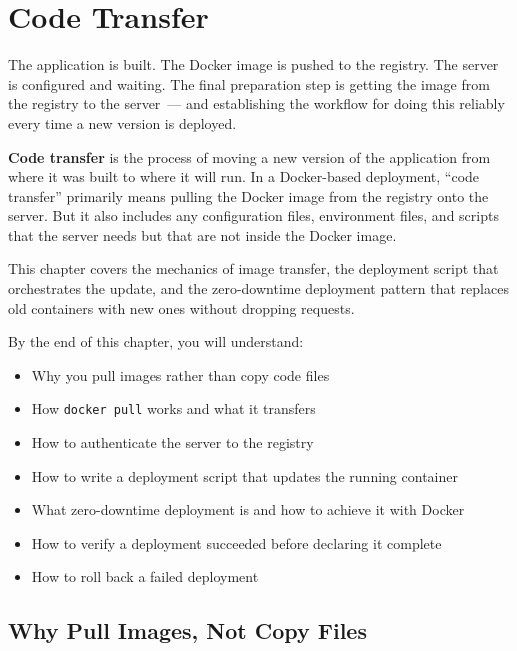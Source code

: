 \setcounter{chapter}{22}
\chapter{Code Transfer}\label{ch:23-code-transfer}

\chapterrule

The application is built. The Docker image is pushed to the registry. The server is configured and waiting. The final preparation step is getting the image from the registry to the server~--- and establishing the workflow for doing this reliably every time a new version is deployed.

\textbf{Code transfer} is the process of moving a new version of the application from where it was built to where it will run. In a Docker-based deployment, ``code transfer'' primarily means pulling the Docker image from the registry onto the server. But it also includes any configuration files, environment files, and scripts that the server needs but that are not inside the Docker image.

This chapter covers the mechanics of image transfer, the deployment script that orchestrates the update, and the zero-downtime deployment pattern that replaces old containers with new ones without dropping requests.

\begin{objectives}

By the end of this chapter, you will understand:

\begin{itemize}
\tightlist
\item
  Why you pull images rather than copy code files
\item
  How \texttt{docker\ pull} works and what it transfers
\item
  How to authenticate the server to the registry
\item
  How to write a deployment script that updates the running container
\item
  What zero-downtime deployment is and how to achieve it with Docker
\item
  How to verify a deployment succeeded before declaring it complete
\item
  How to roll back a failed deployment
\end{itemize}

\end{objectives}

\setcounter{section}{0}
\section{Why Pull Images, Not Copy Files}\label{23-code-transfer:231-why-pull-images-not-copy-files}

